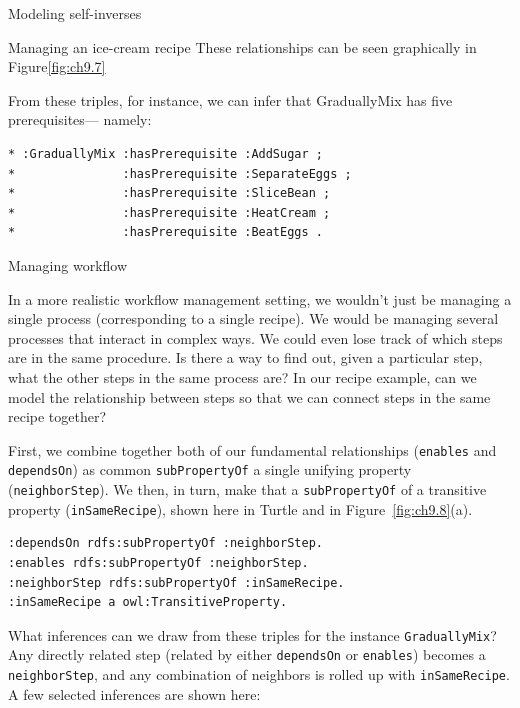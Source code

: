 \begin{challenge}{Modeling self-inverses}
\begin{challenge}{Managing an ice-cream recipe}
These relationships can be seen graphically in Figure\ref{fig:ch9.7}

From these triples, for instance, we can infer that GraduallyMix has
five prerequisites---
namely:

\begin{lstlisting}
* :GraduallyMix :hasPrerequisite :AddSugar ;
*               :hasPrerequisite :SeparateEggs ;
*               :hasPrerequisite :SliceBean ;
*               :hasPrerequisite :HeatCream ;
*               :hasPrerequisite :BeatEggs .
\end{lstlisting}
\end{challenge}


\begin{challenge}{Managing workflow}

In a more realistic workflow management setting, we wouldn't just be
managing a single process (corresponding to a single recipe). We would
be managing several processes that interact in complex ways. We could
even lose track of which steps are in the same procedure. Is there a way
to find out, given a particular step, what the other steps in the same
process are? In our recipe example, can we model the relationship
between steps so that we can connect steps in the same recipe together?

\solution

First, we combine together both of our fundamental relationships
(\texttt{enables} and \texttt{dependsOn}) as common \texttt{subPropertyOf} a single unifying
property (\texttt{neighborStep}). We then, in turn, make that a \texttt{subPropertyOf} of
a transitive property (\texttt{inSameRecipe}), shown here in Turtle and in Figure~\ref{fig:ch9.8}(a).

\begin{lstlisting}
:dependsOn rdfs:subPropertyOf :neighborStep.
:enables rdfs:subPropertyOf :neighborStep.
:neighborStep rdfs:subPropertyOf :inSameRecipe.
:inSameRecipe a owl:TransitiveProperty.
\end{lstlisting}

What inferences can we draw from these triples for the instance
\texttt{GraduallyMix}? Any directly related step (related by either \texttt{dependsOn} or
\texttt{enables}) becomes a \texttt{neighborStep}, and any combination of neighbors is
rolled up with \texttt{inSameRecipe}. A few selected inferences are shown here:


\end{challenge}
\end{challenge}
